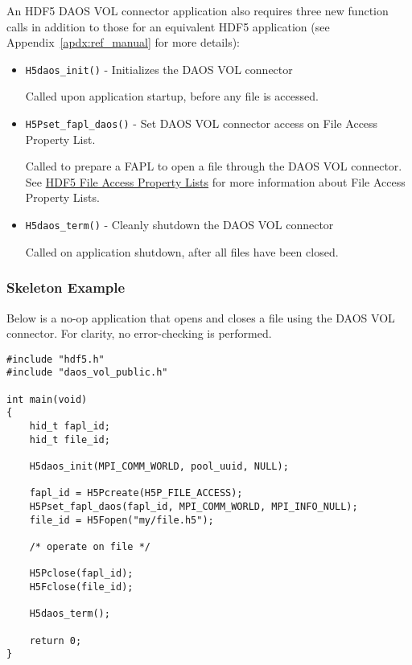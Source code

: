 \documentclass[12pt]{THG_Guide}
\begin{document}
An HDF5 DAOS VOL connector application also requires three new function calls in addition to those for an equivalent HDF5 application (see Appendix~\ref{apdx:ref_manual} for more details):

\begin{itemize}
    \item \texttt{H5daos\_init()} - Initializes the DAOS VOL connector

    Called upon application startup, before any file is accessed.
    
    \item \texttt{H5Pset\_fapl\_daos()} - Set DAOS VOL connector access on File Access Property List.

    Called to prepare a FAPL to open a file through the DAOS VOL connector. See \href{https://support.hdfgroup.org/HDF5/Tutor/property.html#fa}{HDF5 File Access Property Lists} for more information about File Access Property Lists.

    \item \texttt{H5daos\_term()} - Cleanly shutdown the DAOS VOL connector

    Called on application shutdown, after all files have been closed.
\end{itemize}

\newpage

\subsubsection{Skeleton Example}

Below is a no-op application that opens and closes a file using the DAOS VOL connector. For clarity, no error-checking is performed.

\begin{verbatim}
#include "hdf5.h"
#include "daos_vol_public.h"

int main(void)
{
    hid_t fapl_id;
    hid_t file_id;

    H5daos_init(MPI_COMM_WORLD, pool_uuid, NULL);

    fapl_id = H5Pcreate(H5P_FILE_ACCESS);
    H5Pset_fapl_daos(fapl_id, MPI_COMM_WORLD, MPI_INFO_NULL);
    file_id = H5Fopen("my/file.h5");

    /* operate on file */

    H5Pclose(fapl_id);
    H5Fclose(file_id);

    H5daos_term();

    return 0;
}
\end{verbatim}
\end{document}

